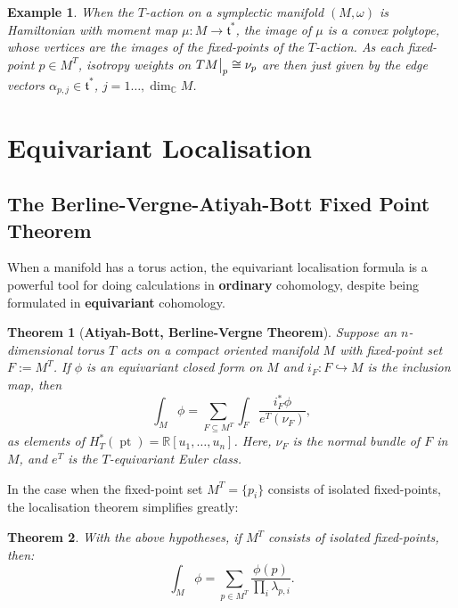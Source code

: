 \documentclass{article}
\newtheorem{theorem}{Theorem}[section]
\newtheorem{example}{Example}
\newcommand{\ra}{\rightarrow}
\newcommand{\w}{\omega}
\newcommand{\RR}{\mathbb{R}}
\newcommand{\CC}{\mathbb{C}}
\newcommand{\mft}{\mathfrak{t}}
\DeclareMathOperator{\pt}{pt}
\newcommand\restr[2]{{%
		\left.\kern-\nulldelimiterspace %
		#1 %
		\vphantom{\big|} %
		\right|_{#2} %
}}
\begin{document}
\begin{example}
		When the $T$-action on a symplectic manifold $(M, \w)$ is Hamiltonian with moment map $\mu : M \ra \mft^{\ast}$, the image of $\mu$ is a convex polytope, whose vertices are the images of the fixed-points of the $T$-action. As each fixed-point $p \in M^{T}$,  isotropy weights on $\restr{TM}{p} \cong \nu_{p}$ are then just given by the edge vectors $\alpha_{p,j} \in \mft^{\ast}$, $j = 1\ldots, \dim_{\CC} M$.
\end{example}

\section{Equivariant Localisation}

\subsection{The Berline-Vergne-Atiyah-Bott Fixed Point Theorem}

When a manifold has a torus action, the equivariant localisation formula is a powerful tool for doing calculations in \textbf{ordinary} cohomology, despite being formulated in \textbf{equivariant} cohomology.

\begin{theorem}[\textbf{Atiyah-Bott, Berline-Vergne Theorem}]
	Suppose an $n$-dimensional torus $T$ acts on a compact oriented manifold $M$ with fixed-point set $F := M^{T}$. If $\phi$ is an equivariant closed form on $M$ and $i_{F}: F \hookrightarrow M$ is the inclusion map, then
	\begin{equation*}
		\int_{M} \phi = \sum\limits_{F \subseteq M^{T}} \int_{F} \frac{i_{F}^{\ast} \phi}{e^{T}(\nu_{F})},
	\end{equation*}
	as elements of $H_{T}^{\ast}(\pt) = \RR[u_{1}, \ldots, u_{n}]$. Here, $\nu_{F}$ is the normal bundle of $F$ in $M$, and $e^{T}$ is the $T$-equivariant Euler class.
\end{theorem}

In the case when the fixed-point set $M^{T} = \{p_{i}\}$ consists of isolated fixed-points, the localisation theorem simplifies greatly:

\begin{theorem}
	With the above hypotheses, if $M^{T}$ consists of isolated fixed-points, then:
	\begin{equation*}
		\int_{M} \phi = \sum\limits_{p \in M^{T}} \frac{\phi(p)}{\prod_{i} \lambda_{p, i}}.
	\end{equation*}
\end{theorem}
\end{document}
